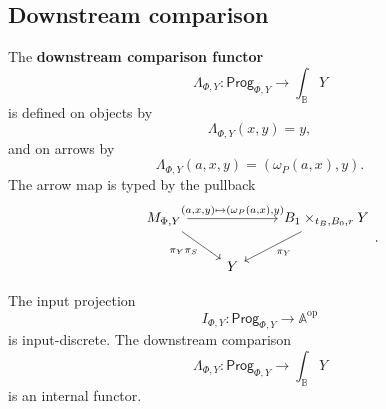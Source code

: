 \subsection{Downstream comparison}
\label{subsec:relative-downstream-comparison}

\begin{definition}
\label{def:relative-downstream-comparison}
The \textbf{downstream comparison functor}
\[
\Lambda_{\Phi,Y}:\mathsf{Prog}_{\Phi,Y}\to\int_{\mathbb B}Y
\]
is defined on objects by
\[
\Lambda_{\Phi,Y}(x,y)=y,
\]
and on arrows by
\[
\Lambda_{\Phi,Y}(a,x,y)
=
(\omega_P(a,x),y).
\]
The arrow map is typed by the pullback
\[
\begin{tikzcd}
M_{\Phi,Y}
\arrow[rr,"{(a,x,y)\mapsto(\omega_P(a,x),y)}"]
\arrow[dr,"\pi_Y\pi_S"']
&&
B_1\times_{t_B,B_0,r}Y
\arrow[dl,"\pi_Y"]
\\
& Y &
\end{tikzcd}
.
\]
\end{definition}

\begin{theorem}
\label{thm:relative-input-downstream-functors}
The input projection
\[
I_{\Phi,Y}:\mathsf{Prog}_{\Phi,Y}\to\mathbb A^{\mathrm{op}}
\]
is input-discrete. The downstream comparison
\[
\Lambda_{\Phi,Y}:\mathsf{Prog}_{\Phi,Y}\to\int_{\mathbb B}Y
\]
is an internal functor.
\end{theorem}

